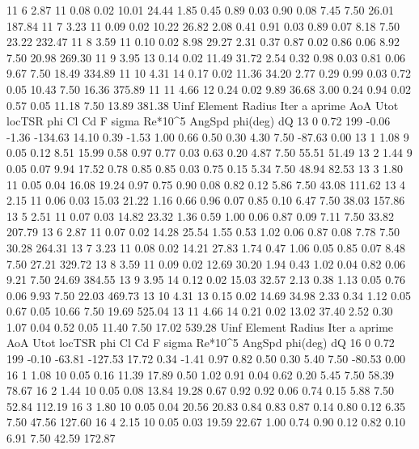 \begin{pythoncode}
11  6  2.87  11  0.08  0.02  10.01  24.44  1.85  0.45  0.89  0.03  0.90  0.08  7.45  7.50  26.01  187.84
11  7  3.23  11  0.09  0.02  10.22  26.82  2.08  0.41  0.91  0.03  0.89  0.07  8.18  7.50  23.22  232.47
11  8  3.59  11  0.10  0.02  8.98  29.27  2.31  0.37  0.87  0.02  0.86  0.06  8.92  7.50  20.98  269.30
11  9  3.95  13  0.14  0.02  11.49  31.72  2.54  0.32  0.98  0.03  0.81  0.06  9.67  7.50  18.49  334.89
11  10  4.31  14  0.17  0.02  11.36  34.20  2.77  0.29  0.99  0.03  0.72  0.05  10.43  7.50  16.36  375.89
11  11  4.66  12  0.24  0.02  9.89  36.68  3.00  0.24  0.94  0.02  0.57  0.05  11.18  7.50  13.89  381.38
Uinf  Element  Radius  Iter  a  aprime  AoA  Utot  locTSR  phi  Cl  Cd  F  sigma  Re*10^5  AngSpd  phi(deg)  dQ
13  0  0.72  199  -0.06  -1.36  -134.63  14.10  0.39  -1.53  1.00  0.66  0.50  0.30  4.30  7.50  -87.63  0.00
13  1  1.08  9  0.05  0.12  8.51  15.99  0.58  0.97  0.77  0.03  0.63  0.20  4.87  7.50  55.51  51.49
13  2  1.44  9  0.05  0.07  9.94  17.52  0.78  0.85  0.85  0.03  0.75  0.15  5.34  7.50  48.94  82.53
13  3  1.80  11  0.05  0.04  16.08  19.24  0.97  0.75  0.90  0.08  0.82  0.12  5.86  7.50  43.08  111.62
13  4  2.15  11  0.06  0.03  15.03  21.22  1.16  0.66  0.96  0.07  0.85  0.10  6.47  7.50  38.03  157.86
13  5  2.51  11  0.07  0.03  14.82  23.32  1.36  0.59  1.00  0.06  0.87  0.09  7.11  7.50  33.82  207.79
13  6  2.87  11  0.07  0.02  14.28  25.54  1.55  0.53  1.02  0.06  0.87  0.08  7.78  7.50  30.28  264.31
13  7  3.23  11  0.08  0.02  14.21  27.83  1.74  0.47  1.06  0.05  0.85  0.07  8.48  7.50  27.21  329.72
13  8  3.59  11  0.09  0.02  12.69  30.20  1.94  0.43  1.02  0.04  0.82  0.06  9.21  7.50  24.69  384.55
13  9  3.95  14  0.12  0.02  15.03  32.57  2.13  0.38  1.13  0.05  0.76  0.06  9.93  7.50  22.03  469.73
13  10  4.31  13  0.15  0.02  14.69  34.98  2.33  0.34  1.12  0.05  0.67  0.05  10.66  7.50  19.69  525.04
13  11  4.66  14  0.21  0.02  13.02  37.40  2.52  0.30  1.07  0.04  0.52  0.05  11.40  7.50  17.02  539.28
Uinf  Element  Radius  Iter  a  aprime  AoA  Utot  locTSR  phi  Cl  Cd  F  sigma  Re*10^5  AngSpd  phi(deg)  dQ
16  0  0.72  199  -0.10  -63.81  -127.53  17.72  0.34  -1.41  0.97  0.82  0.50  0.30  5.40  7.50  -80.53  0.00
16  1  1.08  10  0.05  0.16  11.39  17.89  0.50  1.02  0.91  0.04  0.62  0.20  5.45  7.50  58.39  78.67
16  2  1.44  10  0.05  0.08  13.84  19.28  0.67  0.92  0.92  0.06  0.74  0.15  5.88  7.50  52.84  112.19
16  3  1.80  10  0.05  0.04  20.56  20.83  0.84  0.83  0.87  0.14  0.80  0.12  6.35  7.50  47.56  127.60
16  4  2.15  10  0.05  0.03  19.59  22.67  1.00  0.74  0.90  0.12  0.82  0.10  6.91  7.50  42.59  172.87

\end{pythoncode}
